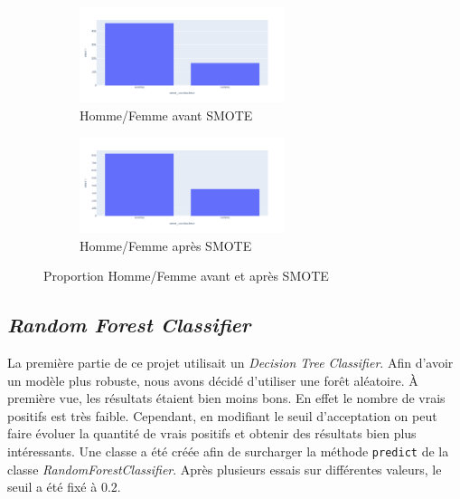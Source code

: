 \documentclass{article}
\begin{document}
    \vspace{1cm}
    \begin{figure}[h]
        \centering
        \begin{subfigure}{6cm}
            \includegraphics[width=6cm]{./img/smote/sex_before.png}
            \caption{Homme/Femme avant SMOTE}\label{fig:before_smote_sex}
        \end{subfigure}
        \vspace{\floatsep}
        \hspace{0.4cm}
        \begin{subfigure}{6cm}
            \includegraphics[width=6cm]{./img/smote/sex_after.png}
        \caption{Homme/Femme après SMOTE}\label{fig:after_smote_sex}
        \end{subfigure}
        \caption{Proportion Homme/Femme avant et après SMOTE}\label{fig:smote2}
    \end{figure}
    \vspace{1cm}

    \subsection{\textit{Random Forest Classifier}}
    La première partie de ce projet utilisait un \textit{Decision Tree Classifier}.
    Afin d'avoir un modèle plus robuste, nous avons décidé d'utiliser une forêt aléatoire.
    À première vue, les résultats étaient bien moins bons. En effet le nombre de 
    vrais positifs est très faible. Cependant, en modifiant le seuil d'acceptation on 
    peut faire évoluer la quantité de vrais positifs et obtenir des résultats bien plus 
    intéressants. Une classe a été créée afin de surcharger la méthode \verb|predict| de 
    la classe \textit{RandomForestClassifier}. Après plusieurs essais sur différentes valeurs, 
    le seuil a été fixé à $0.2$. 
\end{document}
